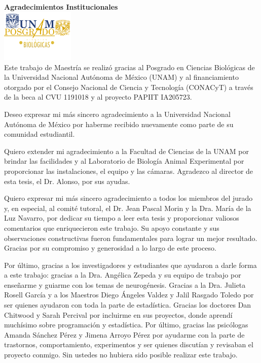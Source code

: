 \documentclass[
]{article}
\begin{document}
\newpage
    \begin{center}
        {\large \textbf{Agradecimientos Institucionales}}\\[0.3cm]
        \includegraphics[width=3.5cm]{ figuras/unamposgrado.png }\\[0.5cm]
        Este trabajo de Maestría se realizó gracias al Posgrado en Ciencias Biológicas de la Universidad Nacional Autónoma de México (UNAM) y al financiamiento otorgado por el Consejo Nacional de Ciencia y Tecnología (CONACyT) a través de la beca al CVU 1191018 y al proyecto PAPIIT IA205723.

        Deseo expresar mi más sincero agradecimiento a la Universidad Nacional Autónoma de México por haberme recibido nuevamente como parte de su comunidad estudiantil. 
        
        Quiero extender mi agradecimiento a la Facultad de Ciencias de la UNAM por brindar las facilidades y al Laboratorio de Biología Animal Experimental por proporcionar las instalaciones, el equipo y las cámaras. Agradezco al director de esta tesis, el Dr. Alonso, por sus ayudas.
        
        Quiero expresar mi más sincero agradecimiento a todos los miembros del jurado y, en especial, al comité tutoral, el Dr. Jean Pascal Morin y la Dra. María de la Luz Navarro, por dedicar su tiempo a leer esta tesis y proporcionar valiosos comentarios que enriquecieron este trabajo. Su apoyo constante y sus observaciones constructivas fueron fundamentales para lograr un mejor resultado. Gracias por su compromiso y generosidad a lo largo de este proceso.
        
        Por último, gracias a los investigadores y estudiantes que ayudaron a darle forma a este trabajo: gracias a la Dra. Angélica Zepeda y su equipo de trabajo por enseñarme y guiarme con los temas de neurogénesis. Gracias a la Dra. Julieta Rosell García y a los Maestros Diego Ángeles Valdez y Jalil Rasgado Toledo por ser quienes ayudaron con toda la parte de estadística. Gracias los doctores Dan Chitwood y Sarah Percival por incluirme en sus proyectos, donde aprendí muchísimo sobre programación y estadística. Por último, gracias las psicólogas Amanda Sánchez Pérez y Jimena Arroyo Pérez por ayudarme con la parte de trastornos, comportamiento, experimentos y ser quienes discutían y revisaban el proyecto conmigo. Sin ustedes no hubiera sido posible realizar este trabajo.
    \end{center}
\end{document}
